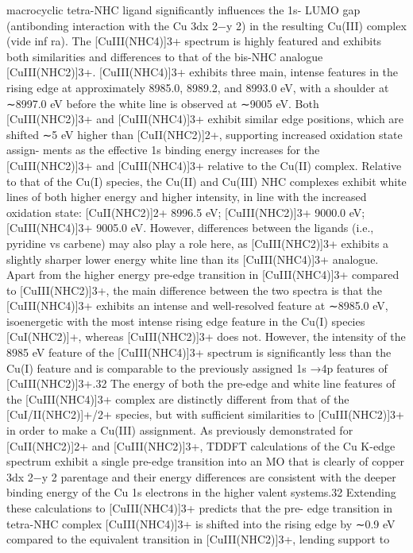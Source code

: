 \documentclass{article}
\begin{document}
macrocyclic tetra-NHC ligand signiﬁcantly inﬂuences the 1s-
LUMO gap (antibonding interaction with the Cu 3dx
2−y
2) in
the
resulting
Cu(III)
complex
(vide
inf ra).
The
[CuIII(NHC4)]3+ spectrum is highly featured and exhibits
both similarities and diﬀerences to that of the bis-NHC
analogue [CuIII(NHC2)]3+. [CuIII(NHC4)]3+ exhibits three
main, intense features in the rising edge at approximately
8985.0, 8989.2, and 8993.0 eV, with a shoulder at ∼8997.0 eV
before the white line is observed at ∼9005 eV. Both
[CuIII(NHC2)]3+ and [CuIII(NHC4)]3+ exhibit similar edge
positions,
which
are
shifted
∼5
eV
higher
than
[CuII(NHC2)]2+, supporting increased oxidation state assign-
ments as the eﬀective 1s binding energy increases for the
[CuIII(NHC2)]3+ and [CuIII(NHC4)]3+ relative to the Cu(II)
complex. Relative to that of the Cu(I) species, the Cu(II) and
Cu(III) NHC complexes exhibit white lines of both higher
energy and higher intensity, in line with the increased
oxidation state: [CuII(NHC2)]2+ 8996.5 eV; [CuIII(NHC2)]3+
9000.0 eV; [CuIII(NHC4)]3+ 9005.0 eV. However, diﬀerences
between the ligands (i.e., pyridine vs carbene) may also play a
role here, as [CuIII(NHC2)]3+ exhibits a slightly sharper lower
energy white line than its [CuIII(NHC4)]3+ analogue. Apart
from the higher energy pre-edge transition in [CuIII(NHC4)]3+
compared to [CuIII(NHC2)]3+, the main diﬀerence between
the two spectra is that the [CuIII(NHC4)]3+ exhibits an intense
and well-resolved feature at ∼8985.0 eV, isoenergetic with the
most intense rising edge feature in the Cu(I) species
[CuI(NHC2)]+, whereas [CuIII(NHC2)]3+ does not. However,
the intensity of the 8985 eV feature of the [CuIII(NHC4)]3+
spectrum is signiﬁcantly less than the Cu(I) feature and is
comparable to the previously assigned 1s →4p features of
[CuIII(NHC2)]3+.32 The energy of both the pre-edge and white
line features of the [CuIII(NHC4)]3+ complex are distinctly
diﬀerent from that of the [CuI/II(NHC2)]+/2+ species, but with
suﬃcient similarities to [CuIII(NHC2)]3+ in order to make a
Cu(III) assignment.
As previously demonstrated for [CuII(NHC2)]2+ and
[CuIII(NHC2)]3+, TDDFT calculations of the Cu K-edge
spectrum exhibit a single pre-edge transition into an MO that
is clearly of copper 3dx
2−y
2 parentage and their energy
diﬀerences are consistent with the deeper binding energy of
the Cu 1s electrons in the higher valent systems.32 Extending
these calculations to [CuIII(NHC4)]3+ predicts that the pre-
edge transition in tetra-NHC complex [CuIII(NHC4)]3+ is
shifted into the rising edge by ∼0.9 eV compared to the
equivalent transition in [CuIII(NHC2)]3+, lending support to
\end{document}
